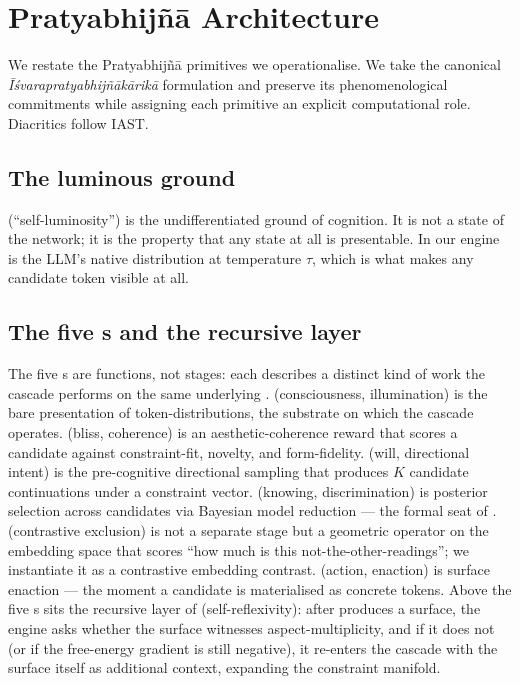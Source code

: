 \section{Pratyabhij\~n\=a Architecture}\label{sec:pratyabhijna_background}

\sloppy

We restate the Pratyabhij\~n\=a primitives we operationalise. We take the canonical \emph{\=I\'svarapratyabhij\~n\=ak\=arik\=a} formulation and preserve its phenomenological commitments while assigning each primitive an explicit computational role. Diacritics follow IAST.

\subsection{The luminous ground}

 (``self-luminosity'') is the undifferentiated ground of cognition. It is not a state of the network; it is the property that any state at all is presentable. In our engine  is the LLM's native distribution at temperature $\tau$, which is what makes any candidate token visible at all.

\subsection{The five s and the recursive layer}

The five s are functions, not stages: each describes a distinct kind of work the cascade performs on the same underlying .  (consciousness, illumination) is the bare presentation of token-distributions, the substrate on which the cascade operates.  (bliss, coherence) is an aesthetic-coherence reward that scores a candidate against constraint-fit, novelty, and form-fidelity.  (will, directional intent) is the pre-cognitive directional sampling that produces $K$ candidate continuations under a constraint vector.  (knowing, discrimination) is posterior selection across candidates via Bayesian model reduction --- the formal seat of .  (contrastive exclusion) is not a separate stage but a geometric operator on the embedding space that scores ``how much is this not-the-other-readings''; we instantiate it as a contrastive embedding contrast.  (action, enaction) is surface enaction --- the moment a candidate is materialised as concrete tokens. Above the five s sits the recursive layer of  (self-reflexivity): after  produces a surface, the engine asks whether the surface witnesses aspect-multiplicity, and if it does not (or if the free-energy gradient is still negative), it re-enters the cascade with the surface itself as additional context, expanding the constraint manifold.

